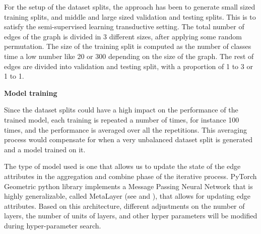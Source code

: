 
For the setup of the dataset splits, the approach has been to generate small sized training splits, and middle and large sized validation and testing splits. This is to satisfy the semi-supervised learning transductive setting. The total number of edges of the graph is divided in 3 different sizes, after applying some random permutation. The size of the training split is computed as the number of classes time a low number like 20 or 300 depending on the size of the graph. The rest of edges are divided into validation and testing split, with a proportion of 1 to 3 or 1 to 1. 




\textbf{Model training}

Since the dataset splits could have a high impact on the performance of the trained model, each training is repeated a number of times, for instance 100 times, and the performance is averaged over all the repetitions. This averaging process would compensate for when a very unbalanced dataset split is generated and a model trained on it.


 The type of model used is one that allows us to update the state of the edge attributes in the aggregation and combine phase of the iterative process. PyTorch Geometric python library implements a Message Passing Neural Network \cite{mpnn} that is highly generalizable, called MetaLayer (see \cite{battaglia2018relational} and \cite{fey2019fast} ), that allows for updating edge attributes. Based on this architecture, different adjustments on the number of layers, the number of units of layers, and other hyper parameters will be modified during hyper-parameter search. 



